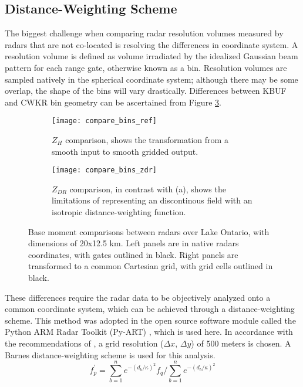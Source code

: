 \subsection{Distance-Weighting Scheme}
The biggest challenge when comparing radar resolution volumes measured by radars that are not co-located is resolving the differences in coordinate system. A
resolution volume is defined as volume irradiated by the idealized Gaussian beam pattern for each range gate, otherwise known as a bin. Resolution volumes
are sampled natively in the spherical coordinate system; although there may be some overlap, the shape of the bins will vary drastically. Differences between
KBUF and CWKR bin geometry can be ascertained from Figure \ref{fig:compare_bins}. 
\begin{figure}[H]
\centering
   \begin{subfigure}{1.0\textwidth} \centering
     \texttt{[image: compare\_bins\_ref]}
     \caption{$Z_H$ comparison, shows the transformation from a smooth input to smooth gridded output.}\label{fig:compare_ref}
   \end{subfigure}
   \begin{subfigure}{1.0\textwidth} \centering
     \texttt{[image: compare\_bins\_zdr]}
     \caption{$Z_{DR}$ comparison, in contrast with (a), shows the limitations of representing an discontinous field with an isotropic distance-weighting
     function. }\label{fig:compare_zdr}
   \end{subfigure}
\caption{Base moment comparisons between radars over Lake Ontario, with dimensions of 20x12.5 km. Left panels are in native radars coordinates, with gates
outlined in black. Right panels are transformed to a common Cartesian grid, with grid cells outlined in black.} \label{fig:compare_bins}
\end{figure}
These differences require the radar data to be objectively analyzed onto a common coordinate system, which can be achieved through a distance-weighting
scheme. This method was adopted in the open source software module called the Python ARM Radar Toolkit (Py-ART) \citep{Py-ART}, which is used here. In
accordance with the recommendations of \cite{Pauly1990}, a grid resolution ($\Delta x$, $\Delta y$) of 500 meters is chosen. A Barnes distance-weighting
scheme is used for this analysis. 
\begin{equation}\label{eq:barnesdws}
f^{'}_{p} = \sum_{b=1}^n  e^{-(d_b/\kappa)^{2}} f_q  \bigg/ \sum_{b=1}^n e^{-(d_b/\kappa)^{2}}
\end{equation}
